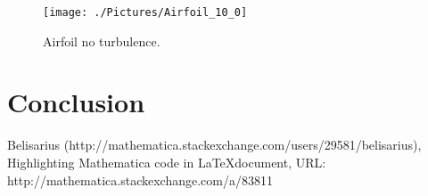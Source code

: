 \documentclass[10pt]{article}
\begin{document}
\begin{figure}[ht]
\centering
\texttt{[image: ./Pictures/Airfoil\_10\_0]}
\caption[Airfoil, No Turbulence]{Airfoil no turbulence.}
\label{airfoil}
\end{figure}

\section{Conclusion}

\lipsum[5-7]

\newpage
\begin{thebibliography}{9}


Belisarius (http://mathematica.stackexchange.com/users/29581/belisarius), Highlighting Mathematica code in \LaTeX document, URL: http://mathematica.stackexchange.com/a/83811

\end{thebibliography}
\end{document}
